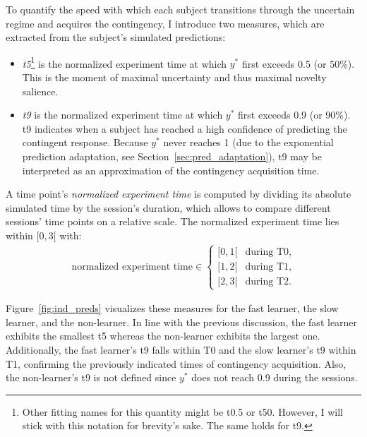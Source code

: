 \documentclass[a4paper]{scrreprt}
\begin{document}
To quantify the speed with which each subject transitions through the uncertain regime and acquires the contingency, I introduce two measures, which are extracted from the subject's simulated predictions:
\begin{itemize}
\item \textit{t5}\footnote{Other fitting names for this quantity might be t0.5 or t50. However, I will stick with this notation for brevity's sake. The same holds for t9.} is the normalized experiment time at which $y^*$ first exceeds 0.5 (or 50\%). This is the moment of maximal uncertainty and thus maximal novelty salience.
\item \textit{t9} is the normalized experiment time at which $y^*$ first exceeds 0.9 (or 90\%). t9 indicates when a subject has reached a high confidence of predicting the contingent response. Because $y^*$ never reaches 1 (due to the exponential prediction adaptation, see Section~\ref{sec:pred_adaptation}), t9 may be interpreted as an approximation of the contingency acquisition time.
\end{itemize}

A time point's \textit{normalized experiment time} is computed by dividing its absolute simulated time by the session's duration, which allows to compare different sessions' time points on a relative scale. The normalized experiment time lies within $[0,3[$ with:
\begin{align}
\text{normalized experiment time} \in 
\begin{cases}
[0,1[ & \text{during T0,}\\
[1,2[ & \text{during T1,}\\
[2,3[ & \text{during T2.}
\end{cases}
\end{align}

Figure~\ref{fig:ind_preds} visualizes these measures for the fast learner, the slow learner, and the non-learner. In line with the previous discussion, the fast learner exhibits the smallest t5 whereas the non-learner exhibits the largest one. Additionally, the fast learner's t9 falls within T0 and the slow learner's t9 within T1, confirming the previously indicated times of contingency acquisition. Also, the non-learner's t9 is not defined since $y^*$ does not reach 0.9 during the sessions.
\end{document}

